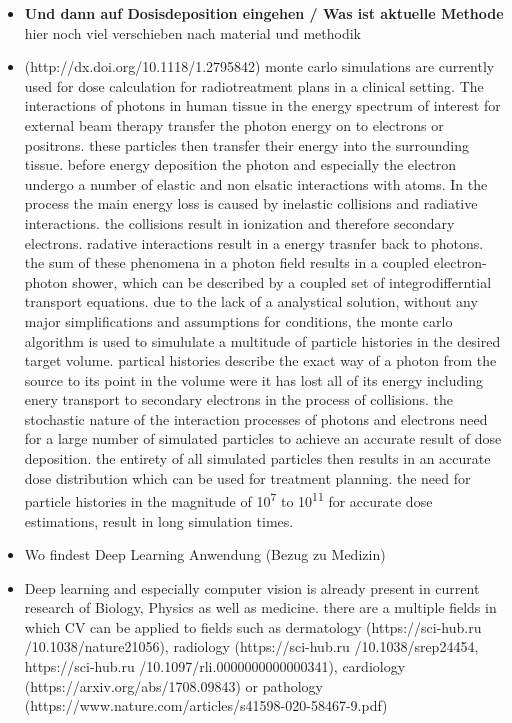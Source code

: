 \begin{itemize}
    \item \textbf{Und dann auf Dosisdeposition eingehen / Was ist aktuelle Methode} hier noch viel verschieben nach material und methodik
    \item (http://dx.doi.org/10.1118/1.2795842) monte carlo simulations are currently used for dose calculation for radiotreatment plans in a clinical setting. The interactions of photons in human tissue in the energy spectrum of interest for external beam therapy transfer the photon energy on to electrons or positrons. these particles then transfer their energy into the surrounding tissue. before energy deposition the photon and especially the electron undergo a number of elastic and non elsatic interactions with atoms. In the process the main energy loss is caused by inelastic collisions and radiative interactions. the collisions result in ionization and therefore secondary electrons. radative interactions result in a energy trasnfer back to photons. the sum of these phenomena in a photon field results in a coupled electron-photon shower, which can be described by a coupled set of integrodifferntial transport equations. due to the lack of a analystical solution, without any major simplifications and assumptions for conditions, the monte carlo algorithm is used to simululate a multitude of particle histories in the desired target volume. partical histories describe the exact way of a photon from the source to its point in the volume were it has lost all of its energy including enery transport to secondary electrons in the process of collisions. the stochastic nature of the interaction processes of photons and electrons need for a large number of simulated particles to achieve an accurate result of dose deposition. the entirety of all simulated particles then results in an accurate dose distribution which can be used for treatment planning. the need for particle histories in the magnitude of 10\textsuperscript{7} to 10\textsuperscript{11} for accurate dose estimations, result in long simulation times. 

    \item Wo findest Deep Learning Anwendung (Bezug zu Medizin)
    \item Deep learning and especially computer vision is already present in current research of Biology, Physics as well as medicine. there are a multiple fields in which CV can be applied to fields such as dermatology (https://sci-hub.ru /10.1038/nature21056), radiology (https://sci-hub.ru /10.1038/srep24454,
    https://sci-hub.ru /10.1097/rli.0000000000000341), cardiology (https://arxiv.org/abs/1708.09843) or pathology (https://www.nature.com/articles/s41598-020-58467-9.pdf)


\end{itemize}
